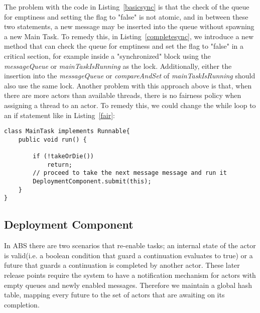 The problem with the code in Listing~\ref{basicsync} is that the check of the queue for emptiness and setting the flag to "false" is not atomic, and in between these two statements, a new message may be inserted into the queue without spawning a new Main Task. To remedy this, in Listing~\ref{completesync}, we introduce a new method that can check the queue for emptiness and set the flag to "false" in a critical section, for example inside a "synchronized" block using the \textit{messageQueue} or \textit{mainTaskIsRunning} as the lock. Additionally, either the insertion into the \textit{messageQueue} or \textit{compareAndSet} of \textit{mainTaskIsRunning} should also use the same lock.  Another problem with this approach above is that, when there are more actors than available threads, there is no fairness policy when assigning a thread to an actor. To remedy this, we could change the while loop to an if statement like in Listing~\ref{fair}: 
\begin{lstlisting}[caption= Fairness Between Actors, label=fair]
class MainTask implements Runnable{
	public void run() {
	
		if (!takeOrDie())
			return;
		// proceed to take the next message message and run it	 
		DeploymentComponent.submit(this);
	}	
}
\end{lstlisting}



\subsection{Deployment Component}

In ABS there are two scenarios that re-enable tasks; an internal state of the actor is valid(i.e. a boolean condition that guard a continuation evaluates to true) or a future that guards a continuation is completed by another actor. These later release points require the system to have a notification mechanism for actors with empty queues and newly enabled messages. Therefore we maintain a global hash table, mapping every future to the set of actors that are awaiting on its completion. 

